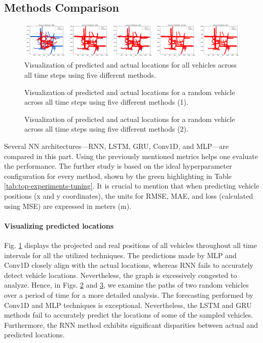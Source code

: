 \documentclass[conference]{IEEEtran}
\begin{document}
{\subsection{Methods Comparison} \label{sec-comparison}
\begin{figure}
    \centering
    \includegraphics[width=\textwidth]{figures/all_vehicles_comparison.png}
    \caption{Visualization of predicted and actual locations for all vehicles across all time steps using five different methods.}
    \label{fig:pred-vs-actual-all-vehicles}
\end{figure}

\begin{figure}
    \centering
    
    \caption{Visualization of predicted and actual locations for a random vehicle across all time steps using five different methods (1).}
    \label{fig:pred-vs-actual-random-vehicle-1}
\end{figure}

\begin{figure}
    \centering
    
    \caption{Visualization of predicted and actual locations for a random vehicle across all time steps using five different methods (2).}
    \label{fig:pred-vs-actual-random-vehicle-2}
\end{figure}

Several NN architectures—RNN, LSTM, GRU, Conv1D, and MLP—are compared in this part. Using the previously mentioned metrics helps one evaluate the performance. The further study is based on the ideal hyperparameter configuration for every method, shown by the green highlighting in Table \ref{tab:top-experiments-tuning}. It is crucial to mention that when predicting vehicle positions (x and y coordinates), the units for RMSE, MAE, and loss (calculated using MSE) are expressed in meters (m).

\paragraph{Visualizing predicted locations}
Fig. \ref{fig:pred-vs-actual-all-vehicles} displays the projected and real positions of all vehicles throughout all time intervals for all the utilized techniques. The predictions made by MLP and Conv1D closely align with the actual locations, whereas RNN fails to accurately detect vehicle locations. Nevertheless, the graph is excessively congested to analyze. Hence, in Figs. \ref{fig:pred-vs-actual-random-vehicle-1} and \ref{fig:pred-vs-actual-random-vehicle-2}, we examine the paths of two random vehicles over a period of time for a more detailed analysis. The forecasting performed by Conv1D and MLP techniques is exceptional. Nevertheless, the LSTM and GRU methods fail to accurately predict the locations of some of the sampled vehicles. Furthermore, the RNN method exhibits significant disparities between actual and predicted locations.

}
\end{document}
